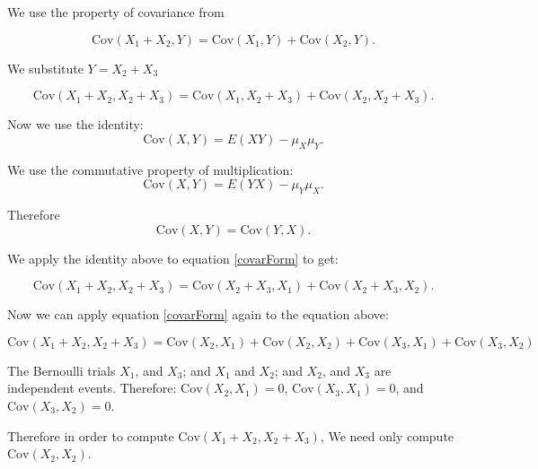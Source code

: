 \documentclass[a4paper,11pt]{article}
\begin{document}
We use the property of covariance from \cite{reading7b}

\begin{equation}\label{covarForm}
\text{Cov}\left(X_1 + X_2, Y \right)
 = \text{Cov}\left(X_1, Y \right) + \text{Cov}\left(X_2, Y \right).
\end{equation}

We substitute $Y=X_2 + X_3$

\begin{equation}
\text{Cov}\left(X_1 + X_2, X_2 + X_3 \right)
 = \text{Cov}\left(X_1, X_2 + X_3 \right) + \text{Cov}\left(X_2, X_2 + X_3 \right).
\end{equation}

Now we use the identity:
\begin{equation}
\text{Cov}\left(X, Y \right) = E\left(XY\right) -\mu_X\mu_Y.
\end{equation}

We use the commutative property of multiplication:
\begin{equation}
\text{Cov}\left(X, Y \right) = E\left(YX\right) -\mu_Y\mu_X.
\end{equation}

Therefore
\begin{equation}
\text{Cov}\left(X, Y \right) = \text{Cov}\left(Y, X \right).
\end{equation}

We apply the identity above to equation \ref{covarForm} to get:

\begin{equation}
\text{Cov}\left(X_1 + X_2, X_2 + X_3 \right)
  =\text{Cov}\left(X_2 + X_3, X_1 \right) + \text{Cov}\left(X_2 + X_3, X_2  \right).
\end{equation}

Now we can apply equation \ref{covarForm} again to the equation
above:

\begin{equation}
\text{Cov}\left(X_1 + X_2, X_2 + X_3 \right)
  =\text{Cov}\left(X_2, X_1 \right) + \text{Cov}\left(X_2, X_2  \right) +
   \text{Cov}\left(X_3, X_1 \right) + \text{Cov}\left(X_3, X_2  \right)
\end{equation}

The Bernoulli trials $X_1$, and $X_3$; and $X_1$ and $X_2$;
and $X_2$, and $X_3$ are independent events. Therefore:
$\text{Cov}\left(X_2, X_1 \right) = 0$,
$\text{Cov}\left(X_3, X_1 \right) = 0$, and
$\text{Cov}\left(X_3, X_2  \right) = 0$.

Therefore in order to compute $\text{Cov}\left(X_1 + X_2, X_2 + X_3 \right)$,
We need only compute $\text{Cov}\left(X_2, X_2 \right)$.
\end{document}
